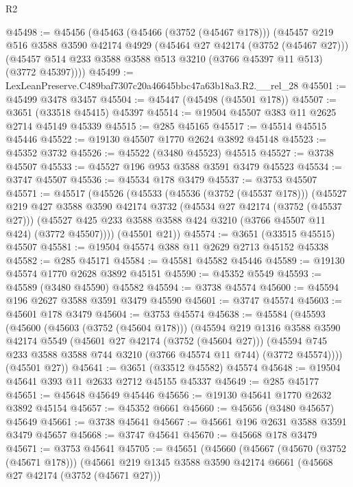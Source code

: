 \begin{lexlean}{R2}
\begin{coremodule}
@45498 := @45456
    (@45463
      (@45466 (@3752 (@45467 @178)))
      (@45457
        @219
        @516
        @3588
        @3590
        @42174
        @4929
        (@45464 @27 @42174 (@3752 (@45467 @27)))
        (@45457 @514 @233 @3588 @3588 @513 @3210 (@3766 @45397 @11 @513) (@3772 @45397))))
@45499 := LexLeanPreserve.C489baf7307c20a46645bbc47a63b18a3.R2.__rel_28
@45501 := @45499 @3478 @3457
@45504 := @45447 (@45498 (@45501 @178))
@45507 := @3651 (@33518 @45415) @45397
@45514 := @19504 @45507 @383 @11 @2625 @2714 @45149 @45339
@45515 := @285 @45165
@45517 := @45514 @45515 @45446
@45522 := @19130 @45507 @1770 @2624 @3892 @45148
@45523 := @45352 @3732
@45526 := @45522 (@3480 @45523) @45515
@45527 := @3738 @45507
@45533 := @45527 @196 @953 @3588 @3591 @3479 @45523
@45534 := @3747 @45507
@45536 := @45534 @178 @3479
@45537 := @3753 @45507
@45571 := @45517
    (@45526
      (@45533
        (@45536 (@3752 (@45537 @178)))
        (@45527
          @219
          @427
          @3588
          @3590
          @42174
          @3732
          (@45534 @27 @42174 (@3752 (@45537 @27)))
          (@45527 @425 @233 @3588 @3588 @424 @3210 (@3766 @45507 @11 @424) (@3772 @45507))))
      (@45501 @21))
@45574 := @3651 (@33515 @45515) @45507
@45581 := @19504 @45574 @388 @11 @2629 @2713 @45152 @45338
@45582 := @285 @45171
@45584 := @45581 @45582 @45446
@45589 := @19130 @45574 @1770 @2628 @3892 @45151
@45590 := @45352 @5549
@45593 := @45589 (@3480 @45590) @45582
@45594 := @3738 @45574
@45600 := @45594 @196 @2627 @3588 @3591 @3479 @45590
@45601 := @3747 @45574
@45603 := @45601 @178 @3479
@45604 := @3753 @45574
@45638 := @45584
    (@45593
      (@45600
        (@45603 (@3752 (@45604 @178)))
        (@45594
          @219
          @1316
          @3588
          @3590
          @42174
          @5549
          (@45601 @27 @42174 (@3752 (@45604 @27)))
          (@45594 @745 @233 @3588 @3588 @744 @3210 (@3766 @45574 @11 @744) (@3772 @45574))))
      (@45501 @27))
@45641 := @3651 (@33512 @45582) @45574
@45648 := @19504 @45641 @393 @11 @2633 @2712 @45155 @45337
@45649 := @285 @45177
@45651 := @45648 @45649 @45446
@45656 := @19130 @45641 @1770 @2632 @3892 @45154
@45657 := @45352 @6661
@45660 := @45656 (@3480 @45657) @45649
@45661 := @3738 @45641
@45667 := @45661 @196 @2631 @3588 @3591 @3479 @45657
@45668 := @3747 @45641
@45670 := @45668 @178 @3479
@45671 := @3753 @45641
@45705 := @45651
    (@45660
      (@45667
        (@45670 (@3752 (@45671 @178)))
        (@45661
          @219
          @1345
          @3588
          @3590
          @42174
          @6661
          (@45668 @27 @42174 (@3752 (@45671 @27)))

\end{coremodule}
\end{lexlean}

